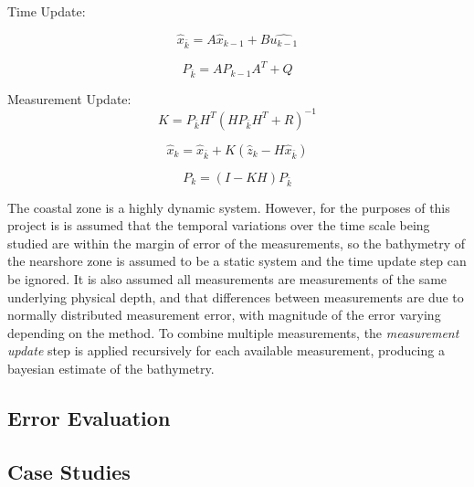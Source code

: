 Time Update:

\begin{equation}
    \hat{x}_{\bar{k}} = A\hat{x}_{k-1} + B\hat{u_{k-1}}
\end{equation}

\begin{equation}
    P_{\bar{k}} = A P_{k-1} A^T + Q
\end{equation}

Measurement Update:
\begin{equation}
    K = P_{\bar{k}} H^T(H P_{\bar{k}} H^T + R) ^{-1}
\end{equation}

\begin{equation}
    \hat{x}_k = \hat{x}_{\bar{k}} + K(\hat{z}_k - H \hat{x}_{\bar{k}})
\end{equation}

\begin{equation}
    P_k = (I - KH)P_{\bar{k}}
\end{equation}


The coastal zone is a highly dynamic system. However, for the purposes of this project is is assumed that the temporal variations over the time scale being studied are within the margin of error of the measurements, so the bathymetry of the nearshore zone is assumed to be a static system and the time update step can be ignored. It is also assumed all measurements are measurements of the same underlying physical depth, and that differences between measurements are due to normally distributed measurement error, with magnitude of the error varying depending on the method. To combine multiple measurements, the \emph{measurement update} step is applied recursively for each available measurement, producing a bayesian estimate of the bathymetry.  

\subsection{Error Evaluation}
\subsection{Case Studies}
